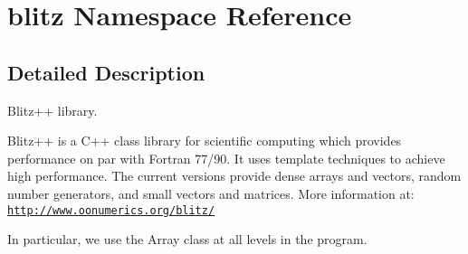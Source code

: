 \hypertarget{namespaceblitz}{\section{blitz \-Namespace \-Reference}
\label{namespaceblitz}
}


\subsection{\-Detailed \-Description}
\-Blitz++ library.

\-Blitz++ is a \-C++ class library for scientific computing which provides performance on par with \-Fortran 77/90. \-It uses template techniques to achieve high performance. \-The current versions provide dense arrays and vectors, random number generators, and small vectors and matrices. \-More information at\-: \href{http://www.oonumerics.org/blitz/}{\tt http\-://www.\-oonumerics.\-org/blitz/}

\-In particular, we use the \-Array class at all levels in the program. 